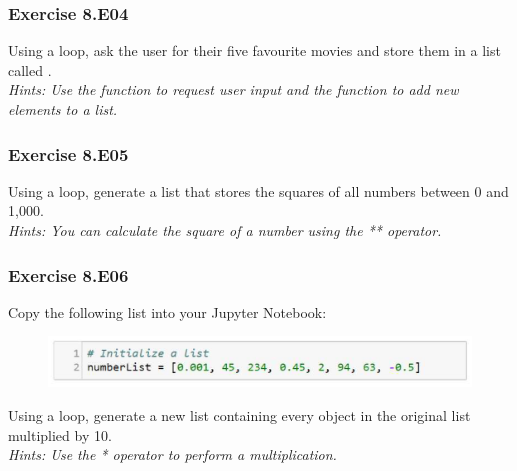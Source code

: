 
\subsubsection*{Exercise 8.E04}
Using a {} loop, ask the user for their five favourite movies and store them in a list called {}.\\


\textit{Hints:
Use the {} function to request user input and the {} function to add new elements to a list.}\\[1cm]



\subsubsection*{Exercise 8.E05}
Using a {} loop, generate a list that stores the squares of all numbers between 0 and 1,000.\\


\textit{Hints:
You can calculate the square of a number using the ** operator.}\\[1cm]



\subsubsection*{Exercise 8.E06}
Copy the following list into your Jupyter Notebook:
\begin{figure}[H]
		\centering
		\includegraphics[width=\textwidth]{../IMG/8E06.png} 
\end{figure}
Using a {} loop, generate a new list containing every object in the original list multiplied by 10.\\


\textit{Hints:
Use the * operator to perform a multiplication.}






